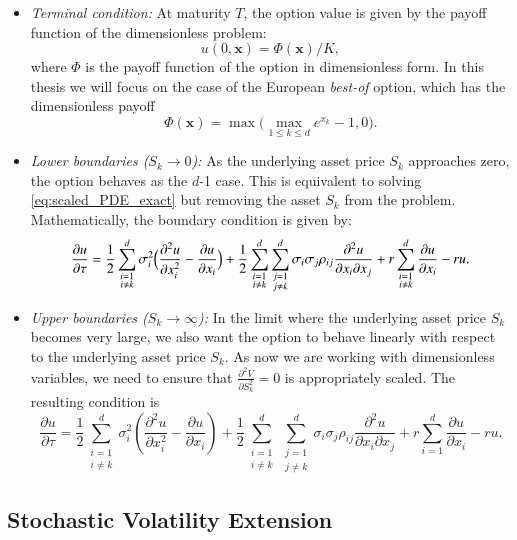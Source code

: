 \documentclass[12pt]{report} %
\theoremstyle{plain} %
\theoremstyle{definition} %
\theoremstyle{remark} %
\begin{document}
\begin{itemize}
	\item \textit{Terminal condition:} At maturity \(T\), the option value is given by the payoff function of the dimensionless problem:
	\[u(0,\mathbf{x}) = \Phi(\mathbf{x})/K,\]	
	where \(\Phi\) is the payoff function of the option in dimensionless form. In this thesis we will focus on the case of the European \emph{best-of} option, which has the dimensionless payoff
	\[\Phi(\mathbf{x}) = \max\bigl(\max_{1\le k\le d}e^{x_k}-1,0\bigr).\]
	\item \textit{Lower boundaries ($S_k \to 0$):} As the underlying asset price \(S_k\) approaches zero, the option behaves as the $d$-1 case. This is equivalent to solving \eqref{eq:scaled_PDE_exact} 
	but removing the asset $S_k$ from the problem. Mathematically, the boundary condition is given by:
	\[
		\frac{\partial u}{\partial \tau} =
			\frac12\sum_{\substack{i=1 \\ i\neq k}}^{d}\sigma_i^{2}
				\Bigl(
					\frac{\partial^{2}u}{\partial x_i^{2}}
				- \frac{\partial u}{\partial x_i}
				\Bigr)
		+ \frac12\sum_{\substack{i=1 \\ i\neq k}}^{d}\sum_{\substack{j=1 \\ j\neq k}}^{d}\sigma_i\sigma_j\rho_{ij}
				\frac{\partial^{2}u}{\partial x_i\partial x_j}
		+ r\sum_{\substack{i=1 \\ i\neq k}}^{d}\frac{\partial u}{\partial x_i}
		- ru.
 	\]
	\item \textit{Upper boundaries ($S_k \to \infty$):} In the limit where the underlying asset price \(S_k\) becomes very large, we also want the option to behave linearly with respect to the underlying asset price $S_k$.
	As now we are working with dimensionless variables, we need to ensure that $\frac{\partial^2 V}{\partial S_k^2} = 0$ is appropriately scaled. The resulting condition is
	\[
		\frac{\partial u}{\partial \tau} =
		\frac{1}{2}\sum_{\substack{i=1 \\ i\neq k}}^d 
		\sigma_i^{2}\left(
		\frac{\partial^{2}u}{\partial x_i^{2}}
		-\frac{\partial u}{\partial x_i}\right)
		+
		\frac{1}{2}\sum_{\substack{i=1 \\ i\neq k}}^d
			\sum_{\substack{j=1 \\ j\neq k}}^d
		\sigma_i\sigma_j\rho_{ij}
		\frac{\partial^{2}u}{\partial x_i\partial x_j}
		+
		r\sum_{i=1}^d\frac{\partial u}{\partial x_i}
		-
		ru.
	\]
\end{itemize}

\subsection{Stochastic Volatility Extension}\label{sec:sv_extension}
\end{document}
